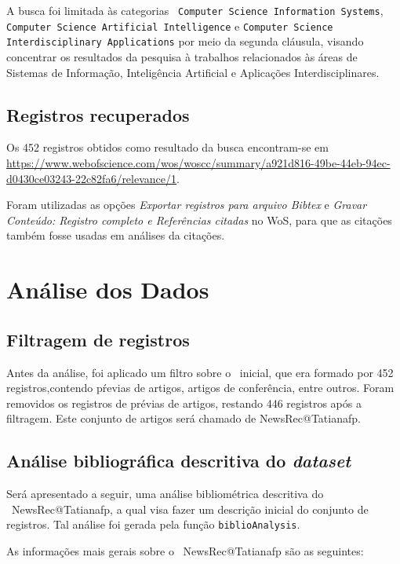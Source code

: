 A busca foi limitada às categorias \texttt{ Computer Science Information Systems}, \texttt{ Computer Science Artificial Intelligence} e \texttt{Computer Science Interdisciplinary Applications} por meio da segunda cláusula, visando concentrar os resultados da pesquisa à trabalhos relacionados às áreas de Sistemas de Informação, Inteligência Artificial e Aplicações Interdisciplinares. 

\subsection{Registros recuperados}

Os 452 registros obtidos como resultado da busca encontram-se em \url{https://www.webofscience.com/wos/woscc/summary/a921d816-49be-44eb-94ec-d0430ce03243-22c82fa6/relevance/1}. 

Foram utilizadas as opções \textit{Exportar registros para arquivo Bibtex} e \textit{Gravar Conteúdo: Registro completo e Referências citadas} no WoS, para que as citações também fosse usadas em análises da citações.

\section{Análise dos Dados}

\subsection{Filtragem de registros}

Antes da análise, foi aplicado um filtro sobre o \dataset\ inicial, que era formado por 452 registros,contendo pŕevias de artigos, artigos de conferência, entre outros. Foram removidos os registros de prévias de artigos, restando 446 registros após a filtragem. Este conjunto de artigos será chamado de NewsRec@Tatianafp. 

\subsection{Análise bibliográfica descritiva do \textit{dataset} }

Será apresentado a seguir, uma análise bibliométrica descritiva do \dataset\   NewsRec@Tatianafp, a qual visa fazer um descrição inicial do conjunto de registros. Tal análise foi gerada pela função \texttt{biblioAnalysis}.

As informações mais gerais sobre o \dataset\ NewsRec@Tatianafp são as seguintes:

